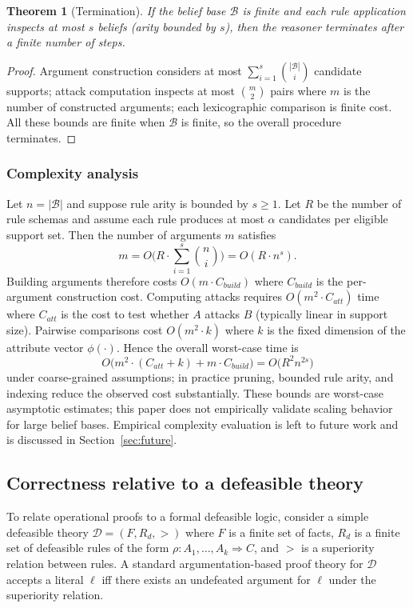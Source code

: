 \documentclass[11pt]{article}
\newtheorem{theorem}{Theorem}
\begin{document}
\begin{theorem}[Termination]
If the belief base $\mathcal{B}$ is finite and each rule application inspects at most
$s$ beliefs (arity bounded by $s$), then the reasoner terminates after a finite
number of steps.
\end{theorem}
\begin{proof}
Argument construction considers at most $\sum_{i=1}^{s}\binom{|\mathcal{B}|}{i}$
candidate supports; attack computation inspects at most $\binom{m}{2}$ pairs where
$m$ is the number of constructed arguments; each lexicographic comparison is finite
cost. All these bounds are finite when $\mathcal{B}$ is finite, so the overall
procedure terminates.
\end{proof}

\subsubsection*{Complexity analysis}
Let $n=|\mathcal{B}|$ and suppose rule arity is bounded by $s\ge 1$. Let $R$ be the
number of rule schemas and assume each rule produces at most $\alpha$ candidates per
eligible support set. Then the number of arguments $m$ satisfies
\[ m = O\big(R\cdot\sum_{i=1}^{s}\binom{n}{i}\big) = O(R\cdot n^{s}).\]
Building arguments therefore costs $O(m\cdot C_{build})$ where $C_{build}$ is the
per-argument construction cost. Computing attacks requires $O(m^{2}\cdot C_{att})$
time where $C_{att}$ is the cost to test whether $A$ attacks $B$ (typically linear
in support size). Pairwise comparisons cost $O(m^{2}\cdot k)$ where $k$ is the fixed
dimension of the attribute vector $\phi(\cdot)$. Hence the overall worst-case time is
\[ O\big(m^{2}\cdot (C_{att}+k) + m\cdot C_{build}\big) = O\big(R^{2} n^{2s}\big)\]
under coarse-grained assumptions; in practice pruning, bounded rule arity, and
indexing reduce the observed cost substantially. These bounds are worst-case
asymptotic estimates; this paper does not empirically validate scaling behavior
for large belief bases. Empirical complexity evaluation is left to future work
and is discussed in Section~\ref{sec:future}.

\subsection{Correctness relative to a defeasible theory}
To relate operational proofs to a formal defeasible logic, consider a simple
defeasible theory $\mathcal{D}=(F,R_d,>)$ where $F$ is a finite set of facts, $R_d$
is a finite set of defeasible rules of the form $\rho: A_1,\ldots,A_k \Rightarrow C$,
and $>$ is a superiority relation between rules. A standard argumentation-based
proof theory for $\mathcal{D}$ accepts a literal $\ell$ iff there exists an
undefeated argument for $\ell$ under the superiority relation.
\end{document}
